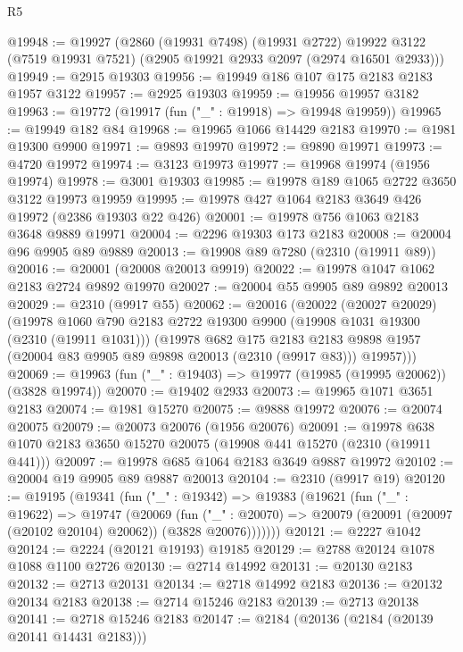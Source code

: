 \begin{lexlean}{R5}
\begin{coremodule}
@19948 := @19927
    (@2860
      (@19931 @7498)
      (@19931 @2722)
      @19922
      @3122
      (@7519 @19931 @7521)
      (@2905 @19921 @2933 @2097 (@2974 @16501 @2933)))
@19949 := @2915 @19303
@19956 := @19949 @186 @107 @175 @2183 @2183 @1957 @3122
@19957 := @2925 @19303
@19959 := @19956 @19957 @3182
@19963 := @19772 (@19917 (fun ("_" : @19918) => @19948 @19959))
@19965 := @19949 @182 @84
@19968 := @19965 @1066 @14429 @2183
@19970 := @1981 @19300 @9900
@19971 := @9893 @19970
@19972 := @9890 @19971
@19973 := @4720 @19972
@19974 := @3123 @19973
@19977 := @19968 @19974 (@1956 @19974)
@19978 := @3001 @19303
@19985 := @19978 @189 @1065 @2722 @3650 @3122 @19973 @19959
@19995 := @19978 @427 @1064 @2183 @3649 @426 @19972 (@2386 @19303 @22 @426)
@20001 := @19978 @756 @1063 @2183 @3648 @9889 @19971
@20004 := @2296 @19303 @173 @2183
@20008 := @20004 @96 @9905 @89 @9889
@20013 := @19908 @89 @7280 (@2310 (@19911 @89))
@20016 := @20001 (@20008 @20013 @9919)
@20022 := @19978 @1047 @1062 @2183 @2724 @9892 @19970
@20027 := @20004 @55 @9905 @89 @9892 @20013
@20029 := @2310 (@9917 @55)
@20062 := @20016
    (@20022
      (@20027 @20029)
      (@19978
        @1060
        @790
        @2183
        @2722
        @19300
        @9900
        (@19908 @1031 @19300 (@2310 (@19911 @1031)))
        (@19978
          @682
          @175
          @2183
          @2183
          @9898
          @1957
          (@20004 @83 @9905 @89 @9898 @20013 (@2310 (@9917 @83)))
          @19957)))
@20069 := @19963 (fun ("_" : @19403) => @19977 (@19985 (@19995 @20062)) (@3828 @19974))
@20070 := @19402 @2933
@20073 := @19965 @1071 @3651 @2183
@20074 := @1981 @15270
@20075 := @9888 @19972
@20076 := @20074 @20075
@20079 := @20073 @20076 (@1956 @20076)
@20091 := @19978 @638 @1070 @2183 @3650 @15270 @20075 (@19908 @441 @15270 (@2310 (@19911 @441)))
@20097 := @19978 @685 @1064 @2183 @3649 @9887 @19972
@20102 := @20004 @19 @9905 @89 @9887 @20013
@20104 := @2310 (@9917 @19)
@20120 := @19195
    (@19341
      (fun ("_" : @19342) =>
      @19383
        (@19621
          (fun ("_" : @19622) =>
          @19747
            (@20069
              (fun ("_" : @20070) =>
              @20079 (@20091 (@20097 (@20102 @20104) @20062)) (@3828 @20076)))))))
@20121 := @2227 @1042
@20124 := @2224 (@20121 @19193) @19185
@20129 := @2788 @20124 @1078 @1088 @1100 @2726
@20130 := @2714 @14992
@20131 := @20130 @2183
@20132 := @2713 @20131
@20134 := @2718 @14992 @2183
@20136 := @20132 @20134 @2183
@20138 := @2714 @15246 @2183
@20139 := @2713 @20138
@20141 := @2718 @15246 @2183
@20147 := @2184 (@20136 (@2184 (@20139 @20141 @14431 @2183)))

\end{coremodule}
\end{lexlean}
